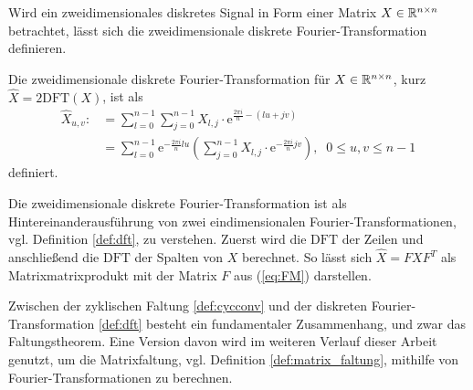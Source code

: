 Wird ein zweidimensionales diskretes Signal in Form einer Matrix $X \in \mathbb{R}^{n \times n}$ betrachtet, lässt sich die zweidimensionale diskrete Fourier-Transformation definieren. 
\begin{defi}
    Die zweidimensionale diskrete Fourier-Transformation für $X \in \mathbb{R}^{n \times n}$, kurz $\hat{X}=2\mathrm{DFT}(X)$, ist als
    \begin{align*}
        \hat{X}_{u,v}:&= \sum_{l=0}^{n-1} \sum_{j=0}^{n-1} X_{l,j} \cdot \mathrm{e}^{\frac{2 \pi i}{n} -(lu+jv)} \\
        &=\sum_{l=0}^{n-1} \mathrm{e}^{-\frac{2 \pi i}{n} l u} \left(\sum_{j=0}^{n-1} X_{l,j} \cdot \mathrm{e}^{-\frac{2 \pi i}{n} j v}\right), \; \; 0 \leq u, v \leq n-1
    \end{align*}
    definiert.
\end{defi}
Die zweidimensionale diskrete Fourier-Transformation ist als Hintereinanderausführung von zwei eindimensionalen Fourier-Transformationen, vgl. Definition \ref{def:dft}, zu verstehen. Zuerst wird die $\mathrm{DFT}$ der Zeilen und anschließend die $\mathrm{DFT}$ der Spalten von $X$ berechnet. So lässt sich $\hat{X}=FXF^T$ als Matrixmatrixprodukt mit der Matrix $F$ aus (\ref{eq:FM}) darstellen.

Zwischen der zyklischen Faltung \ref{def:cycconv} und der diskreten Fourier-Transformation \ref{def:dft} besteht ein fundamentaler Zusammenhang, und zwar das Faltungstheorem. Eine Version davon wird im weiteren Verlauf dieser Arbeit genutzt, um die Matrixfaltung, vgl. Definition \ref{def:matrix_faltung}, mithilfe von Fourier-Transformationen zu berechnen.

